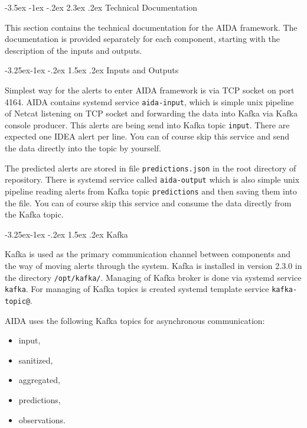 \documentclass[a4paper]{article} %
\makeatletter
\renewcommand{\normalsize}{\fontsize{12}{15}\selectfont\color{textcolor}}
\renewcommand\section{\@startsection {section}{1}{\z@}%
                   {-3.5ex \@plus -1ex \@minus -.2ex}%
                   {2.3ex \@plus.2ex}%
                   {\normalfont\sffamily\Large\bfseries\color{projectcolor}}}
\renewcommand\subsection{\@startsection{subsection}{2}{\z@}%
                   {-3.25ex\@plus -1ex \@minus -.2ex}%
                   {1.5ex \@plus .2ex}%
                   {\normalfont\sffamily\large\bfseries\color{projectcolor}}}
\renewcommand\subsubsection{\@startsection{subsubsection}{3}{\z@}%
                   {-3.25ex\@plus -1ex \@minus -.2ex}%
                   {1.5ex \@plus .2ex}%
                   {\normalfont\sffamily\normalsize\bfseries\color{projectcolor}}}
\makeatother
\begin{document}
% 

\cleardoublepage

\section{Technical Documentation}

This section contains the technical documentation for the AIDA framework. The documentation is provided separately for each component, starting with the description of the inputs and outputs.

\subsection{Inputs and Outputs}

Simplest way for the alerts to enter AIDA framework is via TCP socket on port 4164. AIDA contains systemd service \texttt{aida-input}, which is simple unix pipeline of Netcat listening on TCP socket and forwarding the data into Kafka via Kafka console producer. This alerts are being send into Kafka topic \texttt{input}. There are expected one IDEA alert per line. You can of course skip this service and send the data directly into the topic by yourself.

The predicted alerts are stored in file \texttt{predictions.json} in the root directory of repository. There is systemd service called \texttt{aida-output} which is also simple unix pipeline reading alerts from Kafka topic \texttt{predictions} and then saving them into the file. You can of course skip this service and consume the data directly from the Kafka topic.

\subsection{Kafka}

Kafka is used as the primary communication channel between components and the way of moving alerts through the system. Kafka is installed in version 2.3.0 in the directory \texttt{/opt/kafka/}. Managing of Kafka broker is done via systemd service \texttt{kafka}. For managing of Kafka topics is created systemd template service \texttt{kafka-topic@}.

AIDA uses the following Kafka topics for asynchronous communication:
\begin{itemize}[nolistsep,noitemsep]
\item input,
\item sanitized,
\item aggregated,
\item predictions,
\item observations.
\end{itemize}
\end{document}
